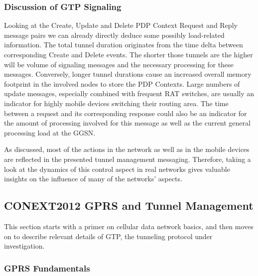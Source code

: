 \subsubsection{Discussion of GTP Signaling}

Looking at the Create, Update and Delete PDP Context Request and Reply message pairs we can already directly deduce some possibly load-related information. The total tunnel duration originates from the time delta between corresponding Create and Delete events. The shorter those tunnels are the higher will be volume of signaling messages and the necessary processing for these messages. Conversely, longer tunnel durations cause an increased overall memory footprint in the involved nodes to store the \ac{PDP} Contexts. Large numbers of update messages, especially combined with frequent \ac{RAT} switches, are usually an indicator for highly mobile devices switching their routing area. 
The time between a request and its corresponding response could also be an indicator for the amount of processing involved for this message as well as the current general processing load at the \ac{GGSN}.

As discussed, most of the actions in the network as well as in the mobile devices are reflected in the presented tunnel management messaging. Therefore, taking a look at the dynamics of this control aspect in real networks gives valuable insights on the influence of many of the networks' aspects.




\subsection{CONEXT2012 GPRS and Tunnel Management}

This section starts with a primer on cellular data network basics, and then moves on to describe relevant details of \ac{GTP}, the tunneling protocol under investigation.



\subsubsection{\acs{GPRS} Fundamentals}

